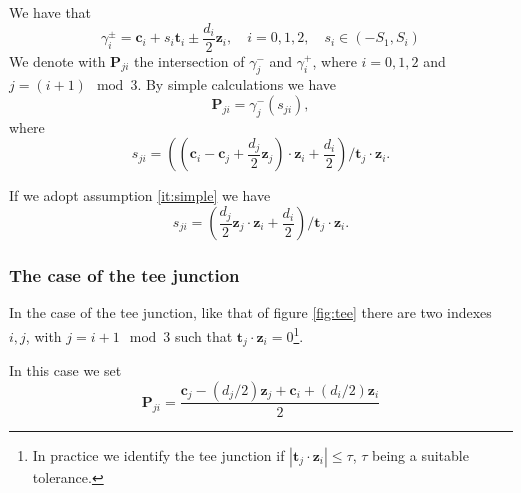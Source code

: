 \documentclass[11pt,a4paper,twoside]{article}
\newcommand{\fracture}{\ensuremath{\gamma}}
\newcommand{\centerpoint}{\ensuremath{\boldsymbol{c}}}
\newcommand{\point}{\ensuremath{\boldsymbol{P}}}
\newcommand{\fracturetangent}{\ensuremath{\boldsymbol{t}}}
\newcommand{\fracturenormal}{\ensuremath{\boldsymbol{z}}}
\begin{document}
We have that
\begin{equation}
\label{eq:fractureborders}
\fracture_i^{\pm}=\centerpoint_i + s_i\fracturetangent_i \pm \frac{d_i}{2}\fracturenormal_i,\quad i=0,1,2,\quad s_i\in (-S_1,S_i)
\end{equation}
We denote with $\point_{ji}$ the intersection of $\fracture_j^{-}$ and
$\fracture_i^{+}$, where $i=0,1,2$ and $j = (i+1)\mod 3$.
By simple calculations we have
\begin{equation}
\point_{ji}=\fracture_j^{-}(s_{ji}),
\end{equation}
where
\begin{equation}
\label{eq:pij}
s_{ji}=\left(
\left(
\centerpoint_i-\centerpoint_j+\dfrac{d_j}{2}\fracturenormal_j
\right)\cdot\fracturenormal_i+\dfrac{d_i}{2}
\right)/\fracturetangent_j\cdot\fracturenormal_i.
\end{equation}

If we adopt assumption \ref{it:simple} we have
\begin{equation}
\label{eq:pij}
s_{ji}=\left(
\dfrac{d_j}{2}\fracturenormal_j\cdot\fracturenormal_i+\dfrac{d_i}{2}
\right)/\fracturetangent_j\cdot\fracturenormal_i.
\end{equation}

\subsubsection{The case of the tee junction}
In the case of the tee junction, like that of figure \ref{fig:tee}
there are two indexes $i,j$, with $j=i+1 \mod 3$ such that
$\fracturetangent_j\cdot\fracturenormal_i=0$\footnote{In practice we
  identify the tee junction if
  $|\fracturetangent_j\cdot\fracturenormal_i|\le \tau$, $\tau$ being a
  suitable tolerance.}.

In this case we set
\begin{equation}
\label{eq:teepoint}
\point_{ji}=\frac{\centerpoint_j-(d_j/2)\fracturenormal_j +
\centerpoint_i+(d_i/2)\fracturenormal_i }{2}
\end{equation}
\end{document}
